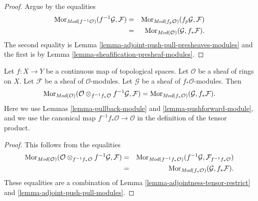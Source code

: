 \begin{proof}
Argue by the equalities
\begin{eqnarray*}
\mathop{\mathrm{Mor}}\nolimits_{\textit{Mod}(f^{-1}\mathcal{O})}(f^{-1}\mathcal{G}, \mathcal{F})
& = &
\mathop{\mathrm{Mor}}\nolimits_{\textit{Mod}(f_p\mathcal{O})}(f_p\mathcal{G}, \mathcal{F}) \\
& = &
\mathop{\mathrm{Mor}}\nolimits_{\textit{Mod}(\mathcal{O})}(\mathcal{G}, f_*\mathcal{F}).
\end{eqnarray*}
The second equality is
Lemma \ref{lemma-adjoint-push-pull-presheaves-modules}
and the first is by Lemma \ref{lemma-sheafification-presheaf-modules}.
\end{proof}

\begin{lemma}
\label{lemma-adjoint-pull-push-modules}
Let $f : X \to Y$ be a continuous map of topological spaces.
Let $\mathcal{O}$ be a sheaf of rings on $X$.
Let $\mathcal{F}$ be a sheaf of $\mathcal{O}$-modules.
Let $\mathcal{G}$ be a sheaf of $f_*\mathcal{O}$-modules.
Then
$$
\mathop{\mathrm{Mor}}\nolimits_{\textit{Mod}(\mathcal{O})}(
\mathcal{O} \otimes_{f^{-1}f_*\mathcal{O}} f^{-1}\mathcal{G}, \mathcal{F})
=
\mathop{\mathrm{Mor}}\nolimits_{\textit{Mod}(f_*\mathcal{O})}(\mathcal{G}, f_*\mathcal{F}).
$$
Here we use
Lemmas \ref{lemma-pullback-module}
and \ref{lemma-pushforward-module}, and we use
the canonical map $f^{-1}f_*\mathcal{O} \to \mathcal{O}$
in the definition of the tensor product.
\end{lemma}

\begin{proof}
This follows from the equalities
\begin{eqnarray*}
\mathop{\mathrm{Mor}}\nolimits_{\textit{Mod}(\mathcal{O})}(
\mathcal{O} \otimes_{f^{-1}f_*\mathcal{O}} f^{-1}\mathcal{G}, \mathcal{F})
& = &
\mathop{\mathrm{Mor}}\nolimits_{\textit{Mod}(f^{-1}f_*\mathcal{O})}(
f^{-1}\mathcal{G}, \mathcal{F}_{f^{-1}f_*\mathcal{O}}) \\
& = &
\mathop{\mathrm{Mor}}\nolimits_{\textit{Mod}(f_*\mathcal{O})}(\mathcal{G}, f_*\mathcal{F}).
\end{eqnarray*}
These equalities are a combination of
Lemma \ref{lemma-adjointness-tensor-restrict}
and \ref{lemma-adjoint-push-pull-modules}.
\end{proof}

